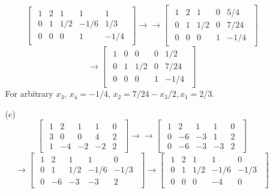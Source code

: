\documentclass[openany]{book}
\begin{document}
\begin{itemize}
\begin{itemize}
$$\begin{bmatrix}
\begin{array}{cccc|c}
1 & 2 & 1 & 1 & 1 \\
0 & 1 & 1/2 & -1/6 & 1/3 \\
0 & 0 & 0 & 1 & -1/4
\end{array}
\end{bmatrix}\rightarrow\rightarrow \begin{bmatrix}
\begin{array}{cccc|c}
1 & 2 & 1 & 0 & 5/4 \\
0 & 1 & 1/2 & 0 & 7/24 \\
0 & 0 & 0 & 1 & -1/4
\end{array}
\end{bmatrix}$$
$$\rightarrow \begin{bmatrix}
\begin{array}{cccc|c}
1 & 0 & 0 & 0 & 1/2 \\
0 & 1 & 1/2 & 0 & 7/24 \\
0 & 0 & 0 & 1 & -1/4
\end{array}
\end{bmatrix}$$
For arbitrary $x_3$, $x_4 = -1/4$, $x_2 = 7/24 - x_3/2, x_1 = 2/3$.
\item[(c)]
$$\begin{bmatrix}
\begin{array}{cccc|c}
1 & 2 & 1 & 1 & 0 \\
3 & 0 & 0 & 4 & 2 \\
1 & -4 & -2 & -2 & 2
\end{array}
\end{bmatrix} \rightarrow\rightarrow \begin{bmatrix}
\begin{array}{cccc|c}
1 & 2 & 1 & 1 & 0 \\
0 & -6 & -3 & 1 & 2 \\
0 & -6 & -3 & -3 & 2
\end{array}
\end{bmatrix}$$
$$ \rightarrow \begin{bmatrix}
\begin{array}{cccc|c}
1 & 2 & 1 & 1 & 0 \\
0 & 1 & 1/2 & -1/6 & -1/3 \\
0 & -6 & -3 & -3 & 2
\end{array}
\end{bmatrix} \rightarrow \begin{bmatrix}
\begin{array}{cccc|c}
1 & 2 & 1 & 1 & 0 \\
0 & 1 & 1/2 & -1/6 & -1/3 \\
0 & 0 & 0 & -4 & 0
\end{array}

\end{bmatrix}$$
\end{itemize}
\end{itemize}
\end{document}
